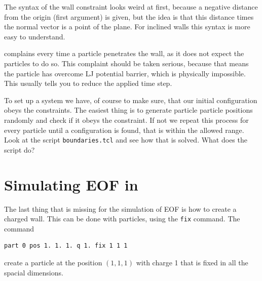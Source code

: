The syntax of the wall constraint looks weird at first, because a negative
distance from the origin (first argument) is given, but the idea is that
this distance times the normal vector is a point of the plane. For inclined
walls this syntax is more easy to understand.

\ES{} complains every time a particle penetrates the wall, as it does not
expect the particles to do so. This complaint should be taken serious, because
that means the particle has overcome LJ potential barrier, which is physically
impossible. This usually tells you to reduce the applied time step.

To set up a system we have, of course to make sure, that our initial
configuration obeys the constraints. The easiest thing is to 
generate particle particle positions randomly and check if it obeys the constraint.
If not we repeat this process
for every particle until a configuration is found, that
is within the allowed range. Look at the script \lstinline|boundaries.tcl|
and see how that is solved. What does the script do?

\section{Simulating EOF in \ES{}}
The last thing that is missing for the simulation of EOF is
how to create a charged wall. This can be done with
particles, using the \lstinline|fix| command. The command
\begin{lstlisting}[numbers=none]
part 0 pos 1. 1. 1. q 1. fix 1 1 1
\end{lstlisting}
create a particle at the position $\left(1,1,1\right)$ with
charge 1 that is fixed in all the spacial dimensions.

